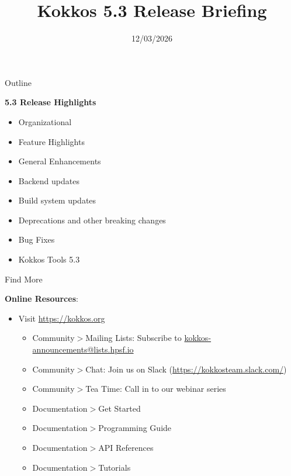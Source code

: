 
\usepackage{tikz}
\graphicspath{{5_3/figures/}}
\usepackage{multicol}
\usepackage{pgfplots}
\usepackage{xfrac}

\def\ornlid{THIS WILL NEED TO BE UPDATED AFTER RESOLUTION}

\title{Kokkos 5.3 Release Briefing}


\date{12/03/2026}





\begin{frame}
  \titlepage
\end{frame}


\begin{frame}[fragile]{Outline}

  \textbf{5.3 Release Highlights}

  \begin{itemize}
    \item{Organizational}
    \item{Feature Highlights}
    \item{General Enhancements}
    \item{Backend updates}
    \item{Build system updates}
    \item{Deprecations and other breaking changes}
    \item{Bug Fixes}
    \item{Kokkos Tools 5.3}
  \end{itemize}

\end{frame}

\begin{frame}{Find More}

  \textbf{Online Resources}:

  \begin{itemize}
  \item Visit \url{https://kokkos.org}
    \begin{itemize}
    \item Community$>$Mailing Lists: Subscribe to \url{kokkos-announcements@lists.hpsf.io}
    \item Community$>$Chat: Join us on Slack (\url{https://kokkosteam.slack.com/})
    \item Community$>$Tea Time: Call in to our webinar series
    \item Documentation$>$Get Started
    \item Documentation$>$Programming Guide
    \item Documentation$>$API References
    \item Documentation$>$Tutorials
    \end{itemize}
  \end{itemize}

\end{frame}

